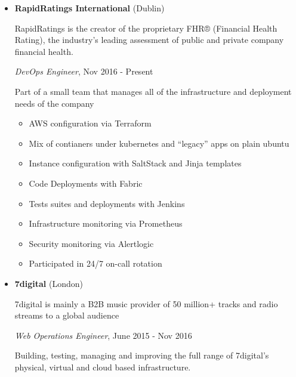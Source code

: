 \documentclass[]{article}
\providecommand{\tightlist}{%
  \setlength{\itemsep}{0pt}\setlength{\parskip}{0pt}}
\begin{document}
\begin{itemize}
\item
  \textbf{RapidRatings International} (Dublin)

  RapidRatings is the creator of the proprietary FHR® (Financial Health
  Rating), the industry's leading assessment of public and private
  company financial health.

  \emph{DevOps Engineer}, Nov 2016 - Present

  Part of a small team that manages all of the infrastructure and
  deployment needs of the company

  \begin{itemize}
  \tightlist
  \item
    AWS configuration via Terraform
  \item
    Mix of contianers under kubernetes and ``legacy'' apps on plain
    ubuntu
  \item
    Instance configuration with SaltStack and Jinja templates
  \item
    Code Deployments with Fabric
  \item
    Tests suites and deployments with Jenkins
  \item
    Infrastructure monitoring via Prometheus
  \item
    Security monitoring via Alertlogic
  \item
    Participated in 24/7 on-call rotation
  \end{itemize}
\item
  \textbf{7digital} (London)

  7digital is mainly a B2B music provider of 50 million+ tracks and
  radio streams to a global audience

  \emph{Web Operations Engineer}, June 2015 - Nov 2016

  Building, testing, managing and improving the full range of 7digital's
  physical, virtual and cloud based infrastructure.


\end{itemize}
\end{document}
